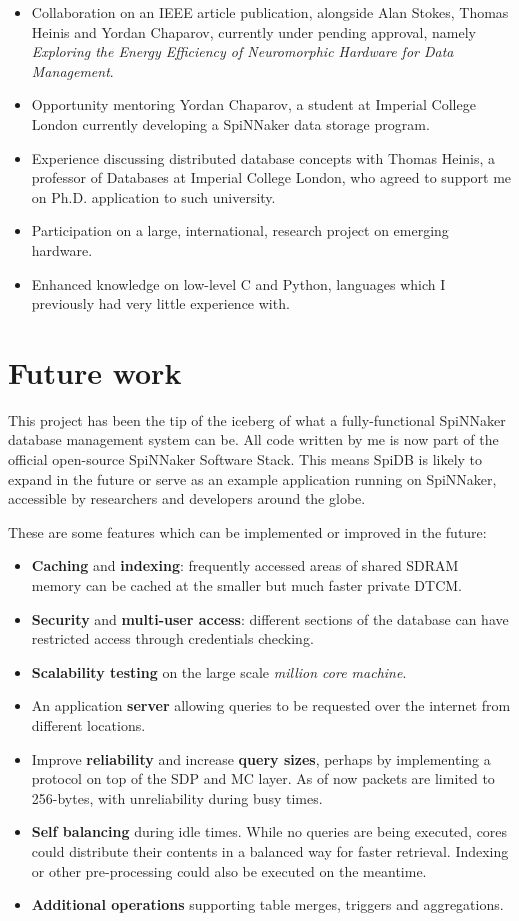 \begin{itemize}
	\item Collaboration on an IEEE article publication, alongside Alan Stokes, Thomas Heinis and Yordan Chaparov, currently under pending approval, namely \textit{Exploring the Energy Efficiency of Neuromorphic Hardware for Data Management}.
	\item Opportunity mentoring Yordan Chaparov, a student at Imperial College London currently developing a SpiNNaker data storage program.
	\item Experience discussing distributed database concepts with Thomas Heinis, a professor of Databases at Imperial College London, who agreed to support me on Ph.D. application to such university.
	\item Participation on a large, international, research project on emerging hardware.
	\item Enhanced knowledge on low-level C and Python, languages which I previously had very little experience with.
\end{itemize}

\section{Future work}
This project has been the tip of the iceberg of what a fully-functional SpiNNaker database management system can be. All code written by me is now part of the official open-source SpiNNaker Software Stack. This means SpiDB is likely to expand in the future or serve as an example application running on SpiNNaker, accessible by researchers and developers around the globe.

These are some features which can be implemented or improved in the future:

\begin{itemize}
	\item \textbf{Caching} and \textbf{indexing}: frequently accessed areas of shared SDRAM memory can be cached at the smaller but much faster private DTCM.
	\item \textbf{Security} and \textbf{multi-user access}: different sections of the database can have restricted access through credentials checking.
	\item \textbf{Scalability testing} on the large scale \textit{million core machine}.
	\item An application \textbf{server} allowing queries to be requested over the internet from different locations.
	\item Improve \textbf{reliability} and increase \textbf{query sizes}, perhaps by implementing a protocol on top of the SDP and MC layer. As of now packets are limited to 256-bytes, with unreliability during busy times.
	\item \textbf{Self balancing} during idle times. While no queries are being executed, cores could distribute their contents in a balanced way for faster retrieval. Indexing or other pre-processing could also be executed on the meantime.
	\item \textbf{Additional operations} supporting table merges, triggers and aggregations.
\end{itemize}